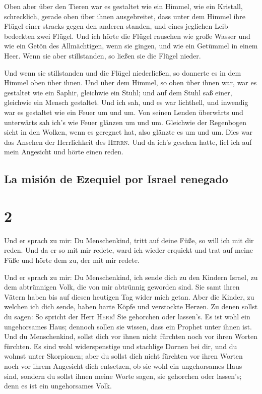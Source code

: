  Oben aber über den Tieren war es gestaltet wie ein
Himmel, wie ein Kristall, schrecklich, gerade oben über ihnen
ausgebreitet,  dass unter dem Himmel ihre Flügel einer
stracks gegen den anderen standen, und eines jeglichen Leib bedeckten
zwei Flügel.  Und ich hörte die Flügel rauschen wie große
Wasser und wie ein Getön des Allmächtigen, wenn sie gingen, und wie ein
Getümmel in einem Heer. Wenn sie aber stillstanden, so ließen sie die
Flügel nieder.

 Und wenn sie stillstanden und die Flügel niederließen,
so donnerte es in dem Himmel oben über ihnen.  Und über
dem Himmel, so oben über ihnen war, war es gestaltet wie ein Saphir,
gleichwie ein Stuhl; und auf dem Stuhl saß einer, gleichwie ein Mensch
gestaltet.  Und ich sah, und es war lichthell, und
inwendig war es gestaltet wie ein Feuer um und um. Von seinen Lenden
überwärts und unterwärts sah ich's wie Feuer glänzen um und um.
 Gleichwie der Regenbogen sieht in den Wolken, wenn es
geregnet hat, also glänzte es um und um. Dies war das Ansehen der
Herrlichkeit des \textsc{Herrn}. Und da ich's gesehen hatte, fiel ich
auf mein Angesicht und hörte einen reden.

\hypertarget{la-misiuxf3n-de-ezequiel-por-israel-renegado}{%
\subsection{La misión de Ezequiel por Israel
renegado}\label{la-misiuxf3n-de-ezequiel-por-israel-renegado}}

\hypertarget{section-1}{%
\section{2}\label{section-1}}

 Und er sprach zu mir: Du Menschenkind, tritt auf deine
Füße, so will ich mit dir reden.  Und da er so mit mir
redete, ward ich wieder erquickt und trat auf meine Füße und hörte dem
zu, der mit mir redete.

 Und er sprach zu mir: Du Menschenkind, ich sende dich zu
den Kindern Israel, zu dem abtrünnigen Volk, die von mir abtrünnig
geworden sind. Sie samt ihren Vätern haben bis auf diesen heutigen Tag
wider mich getan.  Aber die Kinder, zu welchen ich dich
sende, haben harte Köpfe und verstockte Herzen. Zu denen sollst du
sagen: So spricht der Herr \textsc{Herr}!  Sie gehorchen
oder lassen's. Es ist wohl ein ungehorsames Haus; dennoch sollen sie
wissen, dass ein Prophet unter ihnen ist.  Und du
Menschenkind, sollst dich vor ihnen nicht fürchten noch vor ihren Worten
fürchten. Es sind wohl widerspenstige und stachlige Dornen bei dir, und
du wohnst unter Skorpionen; aber du sollst dich nicht fürchten vor ihren
Worten noch vor ihrem Angesicht dich entsetzen, ob sie wohl ein
ungehorsames Haus sind,  sondern du sollst ihnen meine
Worte sagen, sie gehorchen oder lassen's; denn es ist ein ungehorsames
Volk.

